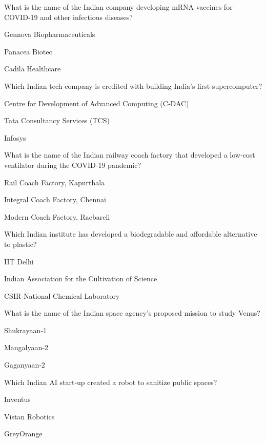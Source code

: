 \begin{enhancedmcq}{What is the name of the Indian company developing mRNA vaccines for COVID‑19 and other infectious diseases?}
\item Gennova Biopharmaceuticals
\item Panacea Biotec
\item Cadila Healthcare

\end{enhancedmcq}
\begin{enhancedmcq}{Which Indian tech company is credited with building India's first supercomputer?}
\item Centre for Development of Advanced Computing (C‑DAC)
\item Tata Consultancy Services (TCS)
\item Infosys

\end{enhancedmcq}
\begin{enhancedmcq}{What is the name of the Indian railway coach factory that developed a low‑cost ventilator during the COVID‑19 pandemic?}
\item Rail Coach Factory, Kapurthala
\item Integral Coach Factory, Chennai
\item Modern Coach Factory, Raebareli

\end{enhancedmcq}
\begin{enhancedmcq}{Which Indian institute has developed a biodegradable and affordable alternative to plastic?}
\item IIT Delhi
\item Indian Association for the Cultivation of Science
\item CSIR‑National Chemical Laboratory

\end{enhancedmcq}
\begin{enhancedmcq}{What is the name of the Indian space agency's proposed mission to study Venus?}
\item Shukrayaan‑1
\item Mangalyaan‑2
\item Gaganyaan‑2

\end{enhancedmcq}
\begin{enhancedmcq}{Which Indian AI start‑up created a robot to sanitize public spaces?}
\item Inventus
\item Vistan Robotics
\item GreyOrange

\end{enhancedmcq}

